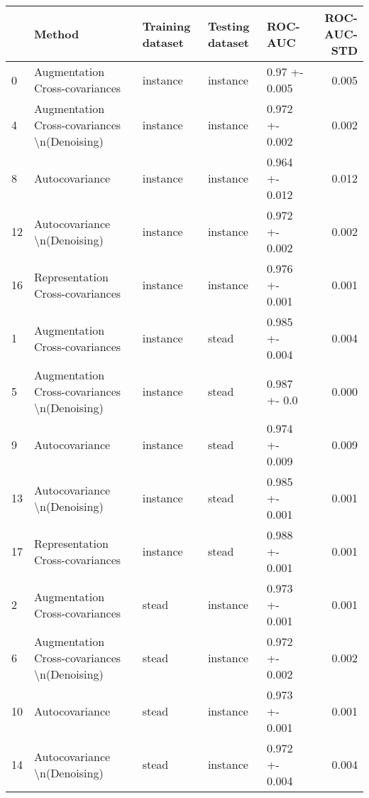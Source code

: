 \begin{tabular}{lllllr}
\toprule
{} &                                        Method & Training dataset & Testing dataset &         ROC-AUC &  ROC-AUC-STD \\
\midrule
0  &                Augmentation Cross-covariances &         instance &        instance &   0.97 +- 0.005 &        0.005 \\
4  &  Augmentation Cross-covariances \textbackslash n(Denoising) &         instance &        instance &  0.972 +- 0.002 &        0.002 \\
8  &                                Autocovariance &         instance &        instance &  0.964 +- 0.012 &        0.012 \\
12 &                  Autocovariance \textbackslash n(Denoising) &         instance &        instance &  0.972 +- 0.002 &        0.002 \\
16 &              Representation Cross-covariances &         instance &        instance &  0.976 +- 0.001 &        0.001 \\
1  &                Augmentation Cross-covariances &         instance &           stead &  0.985 +- 0.004 &        0.004 \\
5  &  Augmentation Cross-covariances \textbackslash n(Denoising) &         instance &           stead &    0.987 +- 0.0 &        0.000 \\
9  &                                Autocovariance &         instance &           stead &  0.974 +- 0.009 &        0.009 \\
13 &                  Autocovariance \textbackslash n(Denoising) &         instance &           stead &  0.985 +- 0.001 &        0.001 \\
17 &              Representation Cross-covariances &         instance &           stead &  0.988 +- 0.001 &        0.001 \\
2  &                Augmentation Cross-covariances &            stead &        instance &  0.973 +- 0.001 &        0.001 \\
6  &  Augmentation Cross-covariances \textbackslash n(Denoising) &            stead &        instance &  0.972 +- 0.002 &        0.002 \\
10 &                                Autocovariance &            stead &        instance &  0.973 +- 0.001 &        0.001 \\
14 &                  Autocovariance \textbackslash n(Denoising) &            stead &        instance &  0.972 +- 0.004 &        0.004 \\

\end{tabular}
